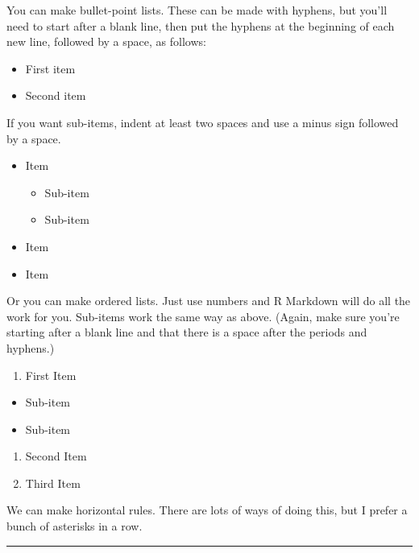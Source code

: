 \documentclass[
]{book}
\providecommand{\tightlist}{%
  \setlength{\itemsep}{0pt}\setlength{\parskip}{0pt}}
\begin{document}
You can make bullet-point lists. These can be made with hyphens, but you'll need to start after a blank line, then put the hyphens at the beginning of each new line, followed by a space, as follows:

\begin{itemize}
\tightlist
\item
  First item
\item
  Second item
\end{itemize}

If you want sub-items, indent at least two spaces and use a minus sign followed by a space.

\begin{itemize}
\tightlist
\item
  Item

  \begin{itemize}
  \tightlist
  \item
    Sub-item
  \item
    Sub-item
  \end{itemize}
\item
  Item
\item
  Item
\end{itemize}

Or you can make ordered lists. Just use numbers and R Markdown will do all the work for you. Sub-items work the same way as above. (Again, make sure you're starting after a blank line and that there is a space after the periods and hyphens.)

\begin{enumerate}
\def\labelenumi{\arabic{enumi}.}
\tightlist
\item
  First Item
\end{enumerate}

\begin{itemize}
\tightlist
\item
  Sub-item
\item
  Sub-item
\end{itemize}

\begin{enumerate}
\def\labelenumi{\arabic{enumi}.}
\setcounter{enumi}{1}
\tightlist
\item
  Second Item
\item
  Third Item
\end{enumerate}

We can make horizontal rules. There are lots of ways of doing this, but I prefer a bunch of asterisks in a row.

\begin{center}\rule{0.5\linewidth}{0.5pt}\end{center}
\end{document}
